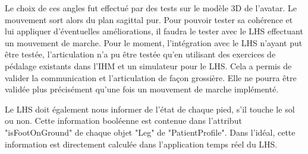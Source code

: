 		\begin{minipage}{\linewidth}
			\label{AvatarArticulationLeg}
		\end{minipage}\medskip
		
		Le choix de ces angles fut effectué par des tests sur le modèle 3D de l'avatar. Le mouvement sort alors du plan sagittal pur. Pour pouvoir tester sa cohérence et lui appliquer d'éventuelles améliorations, il faudra le tester avec le LHS effectuant un mouvement de marche. Pour le moment, l'intégration avec le LHS n'ayant put être testée, l'articulation n'a pu être testée qu'en utilisant des exercices de pédalage existants dans l'IHM et un simulateur pour le LHS. Cela a permis de valider la communication et l'articulation de façon grossière. Elle ne pourra être validée plus précisément qu'une fois un mouvement de marche implémenté.
		
		Le LHS doit également nous informer de l'état de chaque pied, s'il touche le sol ou non. Cette information booléenne est contenue dans l'attribut "isFootOnGround" de chaque objet "Leg" de "PatientProfile". Dans l'idéal, cette information est directement calculée dans l'application temps réel du LHS.
		
